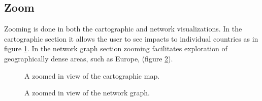 \subsection{Zoom}
Zooming is done in both the cartographic and network visualizations. In the cartographic section it allows the user to see impacts to individual countries as in figure \ref{zoomed}. In the network graph section zooming facilitates exploration of geographically dense areas, such as Europe, (figure \ref{zoomedNetwork}).
	\begin{figure}[htb]
		\caption{A zoomed in view of the cartographic map.}
		\label{zoomed}
	\end{figure}
	\begin{figure}[htb]
		\caption{A zoomed in view of the network graph.}
		\label{zoomedNetwork}
	\end{figure}
